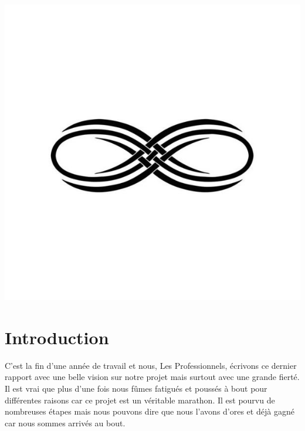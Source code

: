 \documentclass[12pt]{article}
\begin{document}
\begin{center}
\includegraphics[scale=00.20]{infini}
\end{center}


\setlength{\headheight}{13pt} %
\setlength{\headsep}{2.5cm} %
\setlength{\footskip}{2.5cm}



\setcounter{tocdepth}{2} 

\newpage
\thispagestyle{empty}
\pagestyle{fancyplain} \chead{} 
\tableofcontents

\newpage

\section{Introduction}

C’est la fin d’une année de travail et nous, Les Professionnels, écrivons ce dernier rapport avec une belle vision sur notre projet mais surtout avec une grande fierté. Il est vrai que plus d’une fois nous fûmes fatigués et poussés à bout pour différentes raisons car ce projet est un véritable marathon. Il est pourvu de nombreuses étapes mais nous pouvons dire que nous l’avons d’ores et déjà gagné car nous sommes arrivés au bout.
\end{document}
